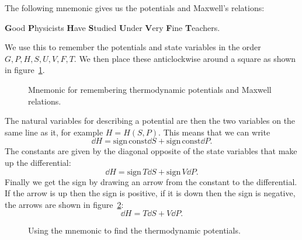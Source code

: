 \documentclass[a4paper]{article}
\begin{document}
    The following mnemonic gives us the potentials and Maxwell's relations:
    \begin{displayquote}
        \textbf{G}ood \textbf{P}hysicists \textbf{H}ave \textbf{S}tudied \textbf{U}nder \textbf{V}ery \textbf{F}ine \textbf{T}eachers.
    \end{displayquote}
    We use this to remember the potentials and state variables in the order \(G, P, H, S, U, V, F, T\).
    We then place these anticlockwise around a square as shown in figure~\ref{fig:mnemonic}.
    \begin{figure}[ht]
        \centering
        \caption{Mnemonic for remembering thermodynamic potentials and Maxwell relations.}
        \label{fig:mnemonic}
    \end{figure}
    The natural variables for describing a potential are then the two variables on the same line as it, for example \(H = H(S, P)\).
    This means that we can write
    \[\dd{H} = \text{sign}\,\text{const}\dd{S} + \text{sign}\,\text{const}\dd{P}.\]
    The constants are given by the diagonal opposite of the state variables that make up the differential:
    \[\dd{H} = \text{sign}\,T\dd{S} + \text{sign}\,V\dd{P}.\]
    Finally we get the sign by drawing an arrow from the constant to the differential.
    If the arrow is up then the sign is positive, if it is down then the sign is negative, the arrows are shown in figure~\ref{fig:mnemonic for H}:
    \[\dd{H} = T\dd{S} + V\dd{P}.\]
    \begin{figure}[ht]
        \centering
        \caption{Using the mnemonic to find the thermodynamic potentials.}
        \label{fig:mnemonic for H}
    \end{figure}
\end{document}
